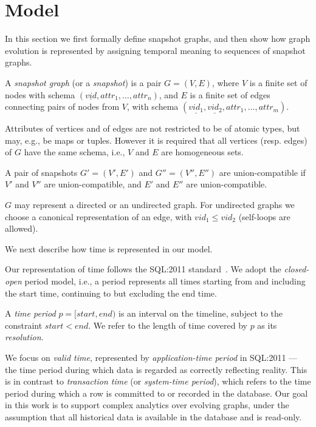 \section{Model}
\label{sec:model}

In this section we first formally define snapshot graphs, and then
show how graph evolution is represented by assigning temporal meaning
to sequences of snapshot graphs.

\begin{definition}
\label{def:sg}
A {\em snapshot graph} (or a {\em snapshot}) is a pair $G = (V,E)$,
where $V$ is a finite set of nodes with schema $(\underline{vid},
attr_1, \ldots, attr_n)$, and $E$ is a finite set of edges connecting
pairs of nodes from $V$, with schema $(\underline{vid_1},
\underline{vid_2}, attr_1, \ldots, attr_m)$.
\end{definition}

Attributes of vertices and of edges are not restricted to be of atomic
types, but may, e.g., be maps or tuples. However it is required that
all vertices (resp. edges) of $G$ have the same schema, i.e., $V$ and
$E$ are homogeneous sets.

A pair of snapshots $G' = (V', E')$ and $G'' = (V'', E'')$ are
union-compatible if $V'$ and $V''$ are union-compatible, and $E'$ and
$E''$ are union-compatible.

$G$ may represent a directed or an undirected graph.  For undirected
graphs we choose a canonical representation of an edge, with $vid_1
\leq vid_2$ (self-loops are allowed).

We next describe how time is represented in our model.

Our representation of time follows the SQL:2011
standard~\cite{DBLP:journals/sigmod/KulkarniM12}.  We adopt the {\em
  closed-open} period model, i.e., a period represents all times
starting from and including the start time, continuing to but
excluding the end time.

\begin{definition}
\label{def:period}
A {\em time period} $p = [start, end)$ is an interval on the timeline,
  subject to the constraint $start < end$.  We refer to the length of
  time covered by $p$ as its {\em resolution}.
\end{definition}

We focus on {\em valid time}, represented by {\em application-time
  period} in SQL:2011 --- the time period during which data is
regarded as correctly reflecting reality.  This is in contrast to {\em
  transaction time} (or {\em system-time period}), which refers to the
time period during which a row is committed to or recorded in the
database.  Our goal in this work is to support complex analytics over
evolving graphs, under the assumption that all historical data is
available in the database and is read-only.

